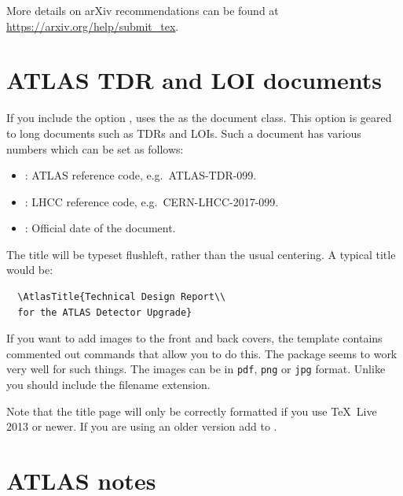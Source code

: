 More details on arXiv recommendations can be found at
\url{https://arxiv.org/help/submit_tex}.


\section{ATLAS TDR and LOI documents}
\label{sec:book}

If you include the option ,  uses the 
as the document class.
This option is geared to long documents such as TDRs and LOIs.
Such a document has various numbers which can be set as follows:
\begin{itemize}\setlength{\parskip}{0pt}\setlength{\itemsep}{0pt}
  \item {}: ATLAS reference code, e.g.\ ATLAS-TDR-099.
  \item {}: LHCC reference code, e.g.\ CERN-LHCC-2017-099.
  \item {}: Official date of the document.
\end{itemize}
The title will be typeset flushleft, rather than the usual centering.
A typical title would be:
\begin{verbatim}
  \AtlasTitle{Technical Design Report\\
  for the ATLAS Detector Upgrade}
\end{verbatim}

If you want to add images to the front and back covers,
the template contains commented out commands that allow you to do this.
The  package seems to work very well for such things.
The images can be in \texttt{pdf}, \texttt{png} or \texttt{jpg} format.
Unlike  you should include the filename extension.

Note that the title page will only be correctly formatted if you use 
\TeX\ Live 2013 or newer. If you are using an older version add 
to .

\section{ATLAS notes}
\label{sec:note}

